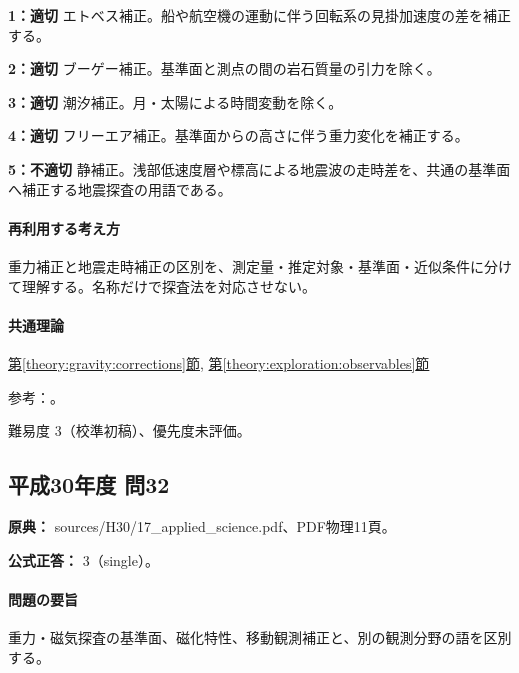 \noindent\textbf{1：適切} エトベス補正。船や航空機の運動に伴う回転系の見掛加速度の差を補正する。\par

\noindent\textbf{2：適切} ブーゲー補正。基準面と測点の間の岩石質量の引力を除く。\par

\noindent\textbf{3：適切} 潮汐補正。月・太陽による時間変動を除く。\par

\noindent\textbf{4：適切} フリーエア補正。基準面からの高さに伴う重力変化を補正する。\par

\noindent\textbf{5：不適切} 静補正。浅部低速度層や標高による地震波の走時差を、共通の基準面へ補正する地震探査の用語である。\par

\paragraph{再利用する考え方} 重力補正と地震走時補正の区別を、測定量・推定対象・基準面・近似条件に分けて理解する。名称だけで探査法を対応させない。

\paragraph{共通理論} \hyperref[theory:gravity:corrections]{第\ref*{theory:gravity:corrections}節}, \hyperref[theory:exploration:observables]{第\ref*{theory:exploration:observables}節}

\par 参考：\cite{gsi_gravity_definitions}。

\par 難易度 3（校準初稿）、優先度未評価。

\subsection{平成30年度 問32}
\label{q:h30-reg-applied-32}

\noindent\textbf{原典：} sources/H30/17\_applied\_science.pdf、PDF物理11頁。

\textbf{公式正答：} 3（single）。

\paragraph{問題の要旨} 重力・磁気探査の基準面、磁化特性、移動観測補正と、別の観測分野の語を区別する。

